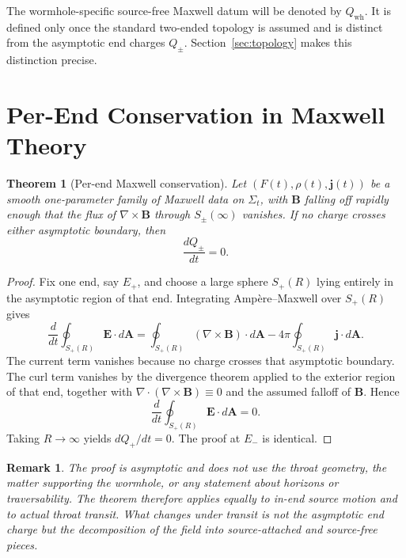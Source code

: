 \documentclass[aps,prd,onecolumn,nofootinbib,superscriptaddress]{revtex4-2}
\newtheorem{theorem}{Theorem}
\newtheorem{remark}{Remark}
\begin{document}
The wormhole-specific source-free Maxwell datum will be denoted by $Q_{\mathrm{wh}}$. It is defined only once the standard two-ended topology is assumed and is distinct from the asymptotic end charges $Q_\pm$. Section~\ref{sec:topology} makes this distinction precise.

\section{Per-End Conservation in Maxwell Theory}
\label{sec:maxwell}

\begin{theorem}[Per-end Maxwell conservation]
\label{thm:maxwell}
Let $(F(t),\rho(t),\bm{j}(t))$ be a smooth one-parameter family of Maxwell data on $\Sigma_t$, with $\bm{B}$ falling off rapidly enough that the flux of $\nabla\times\bm{B}$ through $S_\pm(\infty)$ vanishes. If no charge crosses either asymptotic boundary, then
\begin{equation}
\frac{dQ_\pm}{dt}=0.
\end{equation}
\end{theorem}

\begin{proof}
Fix one end, say $E_+$, and choose a large sphere $S_+(R)$ lying entirely in the asymptotic region of that end. Integrating Amp\`ere--Maxwell over $S_+(R)$ gives
\begin{equation}
\frac{d}{dt}\oint_{S_+(R)} \bm{E}\cdot d\bm{A}
=
\oint_{S_+(R)} (\nabla\times \bm{B})\cdot d\bm{A}
-4\pi \oint_{S_+(R)} \bm{j}\cdot d\bm{A}.
\end{equation}
The current term vanishes because no charge crosses that asymptotic boundary. The curl term vanishes by the divergence theorem applied to the exterior region of that end, together with $\nabla\cdot(\nabla\times\bm{B})\equiv 0$ and the assumed falloff of $\bm{B}$. Hence
\begin{equation}
\frac{d}{dt}\oint_{S_+(R)} \bm{E}\cdot d\bm{A}=0.
\end{equation}
Taking $R\to\infty$ yields $dQ_+/dt=0$. The proof at $E_-$ is identical.
\end{proof}

\begin{remark}
The proof is asymptotic and does not use the throat geometry, the matter supporting the wormhole, or any statement about horizons or traversability. The theorem therefore applies equally to in-end source motion and to actual throat transit. What changes under transit is not the asymptotic end charge but the decomposition of the field into source-attached and source-free pieces.
\end{remark}
\end{document}
